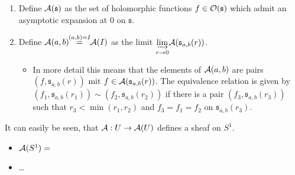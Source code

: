 \begin{defn}
  \begin{enumerate}
    \item Define $\mathcal{A}(\mathfrak{s})$ as the set of holomorphic functions
      $f\in\mathcal{O}(\mathfrak{s})$ which admit an asymptotic expansion at $0$ on
      $\mathfrak{s}$.
    \item Define $\mathcal{A}(a,b)\!\!\overset{(a,b)=I}{=}\!\!\mathcal{A}(I)$
      as the limit
      $\underset{r\to0}{\underrightarrow{\lim}}\mathcal{A}(\mathfrak{s}_{a,b}(r))$.
      \begin{itemize}
        \item[] In more detail this means that the elements of $\mathcal{A}(a,b)$
          are pairs $(f,\mathfrak{s}_{a,b}(r))$ mit
          $f\in\mathcal{A}(\mathfrak{s}_{a,b}(r))$. The equivalence relation is given
          by $(f_1,\mathfrak{s}_{a,b}(r_1))\sim(f_2,\mathfrak{s}_{a,b}(r_2))$
          if there is a pair $(f_3,\mathfrak{s}_{a,b}(r_3))$ such that
          $r_3<\min(r_1,r_2)$ and $f_3=f_1=f_2$ on $\mathfrak{s}_{a,b}(r_3)$.
      \end{itemize}
  \end{enumerate}
\end{defn}
It can easily be seen, that $\mathcal{A}:U\to\mathcal{A}(U)$ defines a sheaf on $S^1$.
\begin{itemize}
  \item $\mathcal{A}(S^1)=$\TODO
  \item\dots
\end{itemize}

